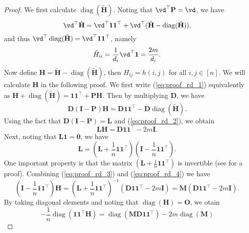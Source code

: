 \documentclass{article} %
\newcommand*{\diag}{\operatorname{diag}}
\begin{document}
\begin{proof}
We first calculate $\diag(\tilde{\mathbf H})$. Noting that $\vd^\top\mathbf P=\vd$, we have
\begin{equation*}
    \vd^\top\tilde{\mathbf H}=\vd^\top\mathbf 1\mathbf 1^\top+\vd^\top(\tilde {\mathbf H}-\diag (\tilde{\mathbf H})),
\end{equation*}
and thus $\vd^\top\diag (\tilde{\mathbf H})=\vd^\top\mathbf 1\mathbf 1^\top$, namely
\begin{equation}
\label{eq:proof_rd_2}
    \tilde H_{ii}=\frac 1 {d_i} \vd^\top\mathbf 1=\frac {2m}{d_i}.
\end{equation}
Now define $\mathbf H=\tilde{\mathbf H}-\diag (\tilde{\mathbf H})$, then $H_{ij}=h(i,j)$ for all $i,j\in[n]$. We will calculate $\mathbf H$ in the following proof. We first write (\ref{eq:proof_rd_1}) equivalently as $\mathbf H+\diag (\tilde{\mathbf H})=\mathbf 1\mathbf 1^\top+\mathbf P\mathbf H$. Then by multiplying $\mathbf D$, we have
\begin{equation}
    \mathbf D(\mathbf I-\mathbf P)\mathbf H=\mathbf D\mathbf 1\mathbf 1^\top-\mathbf D\diag (\tilde{\mathbf H}).
\end{equation}
Using the fact that $\mathbf D(\mathbf I-\mathbf P)=\mathbf L$ and (\ref{eq:proof_rd_2}), we obtain
\begin{equation}
\label{eq:proof_rd_3}
    \mathbf L\mathbf H=\mathbf D\mathbf 1\mathbf 1^\top-2m\mathbf I.
\end{equation}
Next, noting that $\mathbf L\mathbf 1=\mathbf 0$, we have
\begin{equation}
\label{eq:proof_rd_4}
    \mathbf L=\left(\mathbf L+\frac 1 n \mathbf 1\mathbf 1^\top\right)\left(\mathbf I-\frac 1 n \mathbf 1\mathbf 1^\top\right).
\end{equation}
One important property is that the matrix $\left(\mathbf L+\frac 1 n \mathbf 1\mathbf 1^\top\right)$ is invertible (see \citet[Theorem 4]{gutman2004generalized} for a proof). Combining (\ref{eq:proof_rd_3}) and (\ref{eq:proof_rd_4}) we have
\begin{equation}
\label{eq:proof_rd_5}
    \left(\mathbf I-\frac 1 n \mathbf 1\mathbf 1^\top\right)\mathbf H=\left(\mathbf L+\frac 1 n \mathbf 1\mathbf 1^\top\right)^{-1}\left(\mathbf D\mathbf 1\mathbf 1^\top-2m\mathbf I\right)=\mathbf M\left(\mathbf D\mathbf 1\mathbf 1^\top-2m\mathbf I\right).
\end{equation}
By taking diagonal elements and noting that $\diag(\mathbf H)=\mathbf O$, we otain
\begin{equation}
    -\frac 1 n\diag\left( \mathbf 1\mathbf 1^\top\mathbf H\right)=\diag\left(\mathbf M\mathbf D\mathbf 1\mathbf 1^\top\right)-2m\diag\left(\mathbf M\right)

\end{equation}
\end{proof}
\end{document}
